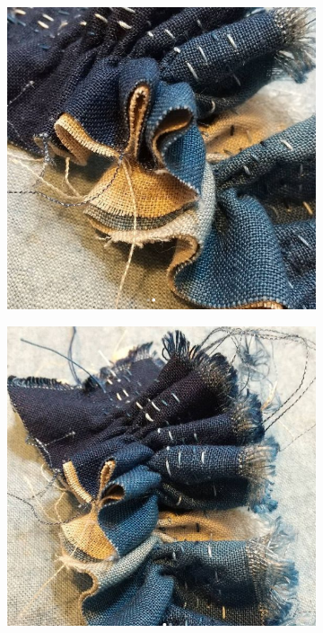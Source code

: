 \documentclass[fontsize=12pt, appendixprefix=true]{scrreprt}
\begin{document}
\begin{figure}[h!]
	\centering
	\begin{subfigure}[b]{0.3\linewidth}
	  \includegraphics[width=\linewidth]{img/hh_01.png}
	  \caption{}
	\end{subfigure}
	\begin{subfigure}[b]{0.3\linewidth}
	  \includegraphics[width=\linewidth]{img/hh_02.png}

\end{subfigure}
\end{figure}
\end{document}

